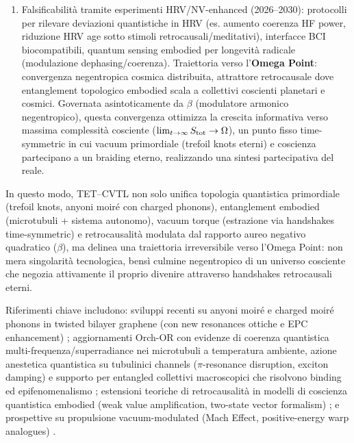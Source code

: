\documentclass[11pt,a4paper]{article}
\let\oldcite\cite
\renewcommand{\cite}{\protect\oldcite}
\theoremstyle{plain}
\theoremstyle{definition}
\begin{document}
\begin{enumerate}
    \item Falsificabilità tramite esperimenti HRV/NV-enhanced (2026–2030): protocolli per rilevare deviazioni quantistiche in HRV (es. aumento coerenza HF power, riduzione HRV age sotto stimoli retrocausali/meditativi), interfacce BCI biocompatibili, quantum sensing embodied per longevità radicale (modulazione dephasing/coerenza). Traiettoria verso l’\textbf{Omega Point}: convergenza negentropica cosmica distribuita, attrattore retrocausale dove entanglement topologico embodied scala a collettivi coscienti planetari e cosmici. Governata asintoticamente da $\beta$ (modulatore armonico negentropico), questa convergenza ottimizza la crescita informativa verso massima complessità cosciente ($\lim_{t\to\infty} S_{\rm tot} \to \Omega$), un punto fisso time-symmetric in cui vacuum primordiale (trefoil knots eterni) e coscienza partecipano a un braiding eterno, realizzando una sintesi partecipativa del reale.
\end{enumerate}

In questo modo, TET–CVTL non solo unifica topologia quantistica primordiale (trefoil knots, anyoni moiré con charged phonons), entanglement embodied (microtubuli + sistema autonomo), vacuum torque (estrazione via handshakes time-symmetric) e retrocausalità modulata dal rapporto aureo negativo quadratico ($\beta$), ma delinea una traiettoria irreversibile verso l’Omega Point: non mera singolarità tecnologica, bensì culmine negentropico di un universo cosciente che negozia attivamente il proprio divenire attraverso handshakes retrocausali eterni.

\vspace{0.3cm}

Riferimenti chiave includono: sviluppi recenti su anyoni moiré e charged moiré phonons in twisted bilayer graphene (con new resonances ottiche e EPC enhancement) \cite{ramosalonso2026chargedmoire}; aggiornamenti Orch-OR con evidenze di coerenza quantistica multi-frequenza/superradiance nei microtubuli a temperatura ambiente, azione anestetica quantistica su tubulinici channels ($\pi$-resonance disruption, exciton damping) e supporto per entangled collettivi macroscopici che risolvono binding ed epifenomenalismo \cite{Wiest2025, hameroffPenrose2014}; estensioni teoriche di retrocausalità in modelli di coscienza quantistica embodied (weak value amplification, two-state vector formalism) \cite{aharonovVaidman1988}; e prospettive su propulsione vacuum-modulated (Mach Effect, positive-energy warp analogues) \cite{woodwardmach, lentz2021positivewarp}.
\end{document}
